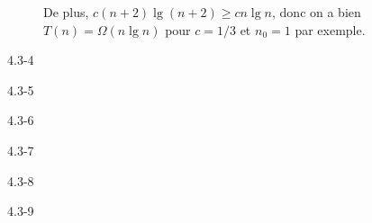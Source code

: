 \begin{description}
\begin{ex}
    De plus, $ c(n+2)\lg(n+2) \ge cn\lg n$, donc on a bien $T(n) = \Omega(n\lg n)$ pour $c = 1/3$ et $n_0 = 1$ par exemple.

  \end{ex}

  \item[4.3-4] {\itshape }

    \begin{exrev}
      
    \end{exrev}

  \item[4.3-5] {\itshape }

    \begin{exrev}
      
    \end{exrev}

  \item[4.3-6] {\itshape }

    \begin{exrev}
      
    \end{exrev}

  \item[4.3-7] {\itshape }

    \begin{exrev}
      
    \end{exrev}

  \item[4.3-8] {\itshape }

    \begin{exrev}
      
    \end{exrev}

  \item[4.3-9] {\itshape }

    \begin{exrev}
      
    \end{exrev}

\end{description}

